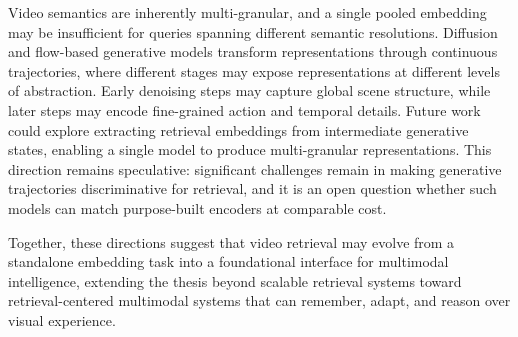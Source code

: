 Video semantics are inherently multi-granular, and a single pooled embedding may be insufficient for queries spanning different semantic resolutions. Diffusion and flow-based generative models transform representations through continuous trajectories, where different stages may expose representations at different levels of abstraction. Early denoising steps may capture global scene structure, while later steps may encode fine-grained action and temporal details. Future work could explore extracting retrieval embeddings from intermediate generative states, enabling a single model to produce multi-granular representations. This direction remains speculative: significant challenges remain in making generative trajectories discriminative for retrieval, and it is an open question whether such models can match purpose-built encoders at comparable cost.

Together, these directions suggest that video retrieval may evolve from a standalone embedding task into a foundational interface for multimodal intelligence, extending the thesis beyond scalable retrieval systems toward retrieval-centered multimodal systems that can remember, adapt, and reason over visual experience.
